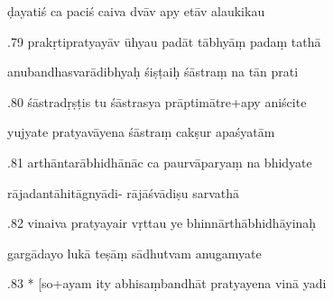 \documentclass[article,12pt,a4paper]{memoir}%
\newcounter{parCount}
\begin{document}
	  
	  \pstart \leavevmode%
	ḍayatiś ca paciś caiva dvāv apy etāv alaukikau 
	{}
	\pend%
      

	  
	  \pstart {}.79 prakṛtipratyayāv ūhyau padāt tābhyāṃ padaṃ tathā 
	{}
	\pend%
      

	  
	  \pstart \leavevmode%
	anubandhasvarādibhyaḥ śiṣṭaiḥ śāstraṃ na tān prati 
	{}
	\pend%
      

	  
	  \pstart {}.80 śāstradṛṣṭis tu śāstrasya prāptimātre+apy aniścite 
	{}
	\pend%
      

	  
	  \pstart \leavevmode%
	yujyate pratyavāyena śāstraṃ cakṣur apaśyatām 
	{}
	\pend%
      

	  
	  \pstart {}.81 arthāntarābhidhānāc ca paurvāparyaṃ na bhidyate 
	{}
	\pend%
      

	  
	  \pstart \leavevmode%
	rājadantāhitāgnyādi- rājāśvādiṣu sarvathā 
	{}
	\pend%
      

	  
	  \pstart {}.82 vinaiva pratyayair vṛttau ye bhinnārthābhidhāyinaḥ 
	{}
	\pend%
      

	  
	  \pstart \leavevmode%
	gargādayo lukā teṣāṃ sādhutvam anugamyate 
	{}
	\pend%
      

	  
	  \pstart {}.83 * [so+ayam ity abhisaṃbandhāt pratyayena vinā yadi 
	{}
	\pend%
      
\end{document}
